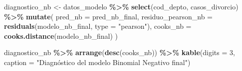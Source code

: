 \documentclass[
]{article}
\newenvironment{Shaded}{\begin{snugshade}}{\end{snugshade}}
\newcommand{\AttributeTok}[1]{\textcolor[rgb]{0.13,0.29,0.53}{#1}}
\newcommand{\DecValTok}[1]{\textcolor[rgb]{0.00,0.00,0.81}{#1}}
\newcommand{\FunctionTok}[1]{\textcolor[rgb]{0.13,0.29,0.53}{\textbf{#1}}}
\newcommand{\NormalTok}[1]{#1}
\newcommand{\OtherTok}[1]{\textcolor[rgb]{0.56,0.35,0.01}{#1}}
\newcommand{\SpecialCharTok}[1]{\textcolor[rgb]{0.81,0.36,0.00}{\textbf{#1}}}
\newcommand{\StringTok}[1]{\textcolor[rgb]{0.31,0.60,0.02}{#1}}
\begin{document}
\begin{Shaded}
\begin{Highlighting}[]
\NormalTok{diagnostico\_nb }\OtherTok{\textless{}{-}}\NormalTok{ datos\_modelo }\SpecialCharTok{\%\textgreater{}\%}
  \FunctionTok{select}\NormalTok{(cod\_depto, casos\_divorcio) }\SpecialCharTok{\%\textgreater{}\%}
  \FunctionTok{mutate}\NormalTok{(}
    \AttributeTok{pred\_nb            =}\NormalTok{ pred\_nb\_final,}
    \AttributeTok{residuo\_pearson\_nb =} \FunctionTok{residuals}\NormalTok{(modelo\_nb\_final, }\AttributeTok{type =} \StringTok{"pearson"}\NormalTok{),}
    \AttributeTok{cooks\_nb           =} \FunctionTok{cooks.distance}\NormalTok{(modelo\_nb\_final)}
\NormalTok{  )}

\NormalTok{diagnostico\_nb }\SpecialCharTok{\%\textgreater{}\%}
  \FunctionTok{arrange}\NormalTok{(}\FunctionTok{desc}\NormalTok{(cooks\_nb)) }\SpecialCharTok{\%\textgreater{}\%}
  \FunctionTok{kable}\NormalTok{(}\AttributeTok{digits =} \DecValTok{3}\NormalTok{,}
        \AttributeTok{caption =} \StringTok{"Diagnóstico del modelo Binomial Negativo final"}\NormalTok{)}
\end{Highlighting}
\end{Shaded}
\end{document}
